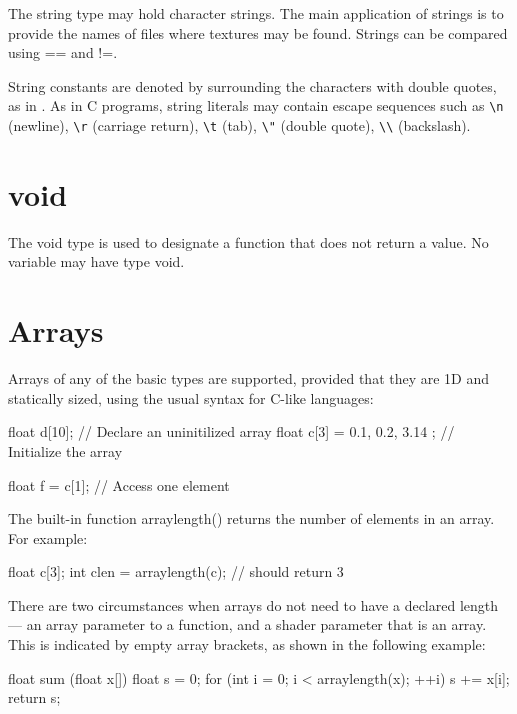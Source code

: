 \documentclass[11pt,letterpaper]{book}
\def\void{{\cf void}\xspace}
\begin{document}
The {\cf string} type may hold character strings.  The main application
of strings is to provide the names of files where textures may be
found.  Strings can be compared using {\cf ==} and {\cf !=}.

String constants are denoted by surrounding the characters with double
quotes, as in .  As in C programs, string
literals may contain escape sequences such as \verb|\n| (newline),
\verb|\r| (carriage return), \verb|\t| (tab), \verb|\"| (double quote),
\verb|\\| (backslash).

\section{\void}
\label{sec:types:void}
 

The \void type is used to designate a function that does not return
a value.  No variable may have type \void.

\section{Arrays}
\label{sec:types:arrays}
 

Arrays of any of the basic types are supported, provided that they
are 1D and statically sized, using the usual syntax for C-like languages:

\begin{code}
    float d[10];                       // Declare an uninitilized array
    float c[3] = { 0.1, 0.2, 3.14 };   // Initialize the array

    float f = c[1];                    // Access one element
\end{code}

The built-in function {\cf arraylength()} returns the number of elements
in an array.  For example:

\begin{code}
    float c[3];
    int clen = arraylength(c);        // should return 3
\end{code}

There are two circumstances when arrays do not need to have a declared
length --- an array parameter to a function, and a shader parameter that
is an array.  This is indicated by empty array brackets, as shown in the
following example:

\begin{code}
    float sum (float x[])
    {
        float s = 0;
        for (int i = 0;  i < arraylength(x);  ++i)
            s += x[i];
        return s;
    }
\end{code}
\end{document}
